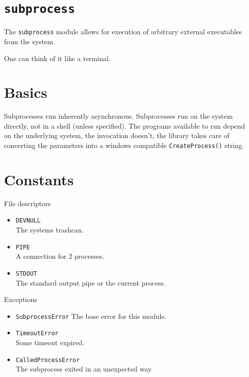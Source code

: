 \section{\texorpdfstring{\texttt{subprocess}}{subprocess}}\label{subprocess}

\begin{frame}

The \texttt{subprocess} module allows for execution of arbitrary
external executables from the system.

One can think of it like a terminal.

\end{frame}

\section{Basics}\label{basics}

\begin{frame}

Subprocesses run inherently asynchronous. Subprocesses run on the system
directly, not in a shell (unless specified). The programs available to
run depend on the underlying system, the invocation doesn't, the library
takes care of converting the parameters into a windows compatible
\texttt{CreateProcess()} string.

\end{frame}

\section{Constants}\label{constants}

\begin{frame}{File descriptors}

\begin{itemize}
\itemsep1pt\parskip0pt
\item
  \texttt{DEVNULL}\\The systems trashcan.
\item
  \texttt{PIPE}\\A connection for 2 processes.
\item
  \texttt{STDOUT}\\The standard output pipe or the current process.
\end{itemize}

\end{frame}

\begin{frame}{Exceptions}

\begin{itemize}
\itemsep1pt\parskip0pt
\item
  \texttt{SubprocessError} The base error for this module.
\item
  \texttt{TimeoutError}\\Some timeout expired.
\item
  \texttt{CalledProcessError}\\The subprocess exited in an unexpected
  way.
\end{itemize}

\end{frame}

